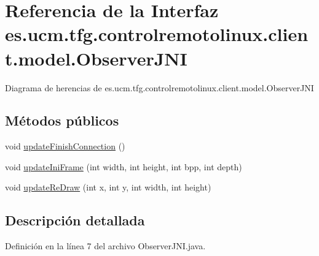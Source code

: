 \hypertarget{interfacees_1_1ucm_1_1tfg_1_1controlremotolinux_1_1client_1_1model_1_1ObserverJNI}{\section{Referencia de la Interfaz es.\-ucm.\-tfg.\-controlremotolinux.\-client.\-model.\-Observer\-J\-N\-I}
\label{interfacees_1_1ucm_1_1tfg_1_1controlremotolinux_1_1client_1_1model_1_1ObserverJNI}
}


Diagrama de herencias de es.\-ucm.\-tfg.\-controlremotolinux.\-client.\-model.\-Observer\-J\-N\-I
\subsection*{Métodos públicos}
\begin{DoxyCompactItemize}
\item 
void \hyperlink{interfacees_1_1ucm_1_1tfg_1_1controlremotolinux_1_1client_1_1model_1_1ObserverJNI_afc82d81b05ee95fd10c15f8a44dacdfc}{update\-Finish\-Connection} ()
\item 
void \hyperlink{interfacees_1_1ucm_1_1tfg_1_1controlremotolinux_1_1client_1_1model_1_1ObserverJNI_aa00a5df797f890ab5098b302cd1c7f2f}{update\-Ini\-Frame} (int width, int height, int bpp, int depth)
\item 
void \hyperlink{interfacees_1_1ucm_1_1tfg_1_1controlremotolinux_1_1client_1_1model_1_1ObserverJNI_a402cb41dca21898cc49eebed28eab7eb}{update\-Re\-Draw} (int x, int y, int width, int height)
\end{DoxyCompactItemize}


\subsection{Descripción detallada}


Definición en la línea 7 del archivo Observer\-J\-N\-I.\-java.




